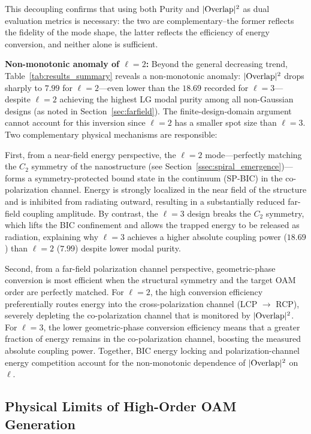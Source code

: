 This decoupling confirms that using both Purity and $|{\rm Overlap}|^2$ as dual evaluation metrics is necessary: the two are complementary--the former reflects the fidelity of the mode shape, the latter reflects the efficiency of energy conversion, and neither alone is sufficient.

\textbf{Non-monotonic anomaly of $\ell = 2$:} Beyond the general decreasing trend, Table~\ref{tab:results_summary} reveals a non-monotonic anomaly: $|{\rm Overlap}|^2$ drops sharply to $7.99$ for $\ell = 2$---even lower than the $18.69$ recorded for $\ell = 3$---despite $\ell = 2$ achieving the highest LG modal purity among all non-Gaussian designs (as noted in Section~\ref{sec:farfield}). The finite-design-domain argument cannot account for this inversion since $\ell = 2$ has a smaller spot size than $\ell = 3$. Two complementary physical mechanisms are responsible:

First, from a near-field energy perspective, the $\ell = 2$ mode---perfectly matching the $C_2$ symmetry of the nanostructure (see Section~\ref{ssec:spiral_emergence})---forms a symmetry-protected bound state in the continuum (SP-BIC) in the co-polarization channel. Energy is strongly localized in the near field of the structure and is inhibited from radiating outward, resulting in a substantially reduced far-field coupling amplitude. By contrast, the $\ell = 3$ design breaks the $C_2$ symmetry, which lifts the BIC confinement and allows the trapped energy to be released as radiation, explaining why $\ell = 3$ achieves a higher absolute coupling power ($18.69$) than $\ell = 2$ ($7.99$) despite lower modal purity.

Second, from a far-field polarization channel perspective, geometric-phase conversion is most efficient when the structural symmetry and the target OAM order are perfectly matched. For $\ell = 2$, the high conversion efficiency preferentially routes energy into the cross-polarization channel (LCP $\rightarrow$ RCP), severely depleting the co-polarization channel that is monitored by $|{\rm Overlap}|^2$. For $\ell = 3$, the lower geometric-phase conversion efficiency means that a greater fraction of energy remains in the co-polarization channel, boosting the measured absolute coupling power. Together, BIC energy locking and polarization-channel energy competition account for the non-monotonic dependence of $|{\rm Overlap}|^2$ on $\ell$.

\subsection{Physical Limits of High-Order OAM Generation}

